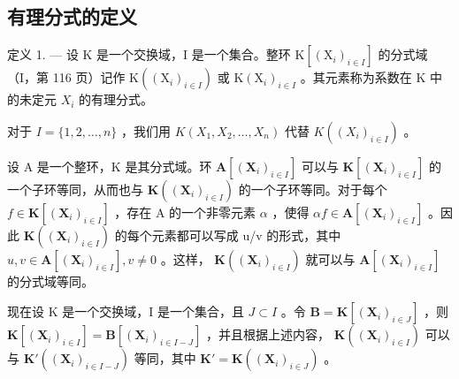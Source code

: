 \subsection{有理分式的定义}

定义 1. --- 设 K 是一个交换域，I 是一个集合。整环 \(\mathrm{K}[(\mathrm{X}_{i})_{i\in I}]\) 的分式域（I，第 116 页）记作 \(\mathrm{K}((\mathrm{X}_{i})_{i\in I})\) 或 \(\mathrm{K}(\mathrm{X}_{i})_{i\in I}\) 。其元素称为系数在 K 中的未定元 \(X_{i}\) 的有理分式。

对于 \(I = \{1, 2, \dots, n\}\) ，我们用 \(K(X_1, X_2, \dots, X_n)\) 代替 \(K((X_i)_{i \in I})\) 。

设 A 是一个整环，K 是其分式域。环 \(\mathbf{A}[(\mathbf{X}_{i})_{i\in I}]\) 可以与 \(\mathbf{K}[(\mathbf{X}_{i})_{i\in I}]\) 的一个子环等同，从而也与 \(\mathbf{K}((\mathbf{X}_{i})_{i\in I})\) 的一个子环等同。对于每个 \(f\in\mathbf{K}[(\mathbf{X}_{i})_{i\in I}]\) ，存在 A 的一个非零元素 \(\alpha\) ，使得 \(\alpha f\in\mathbf{A}[(\mathbf{X}_{i})_{i\in I}]\) 。因此 \(\mathbf{K}((\mathbf{X}_{i})_{i\in I})\) 的每个元素都可以写成 u/v 的形式，其中 \(u,v\in\mathbf{A}[(\mathbf{X}_{i})_{i\in I}],v\neq0\) 。这样， \(\mathbf{K}((\mathbf{X}_{i})_{i\in I})\) 就可以与 \(\mathbf{A}[(\mathbf{X}_{i})_{i\in I}]\) 的分式域等同。

现在设 K 是一个交换域，I 是一个集合，且 \(J \subset I\) 。令 \(\mathbf{B} = \mathbf{K}[(\mathbf{X}_i)_{i \in J}]\) ，则 \(\mathbf{K}[(\mathbf{X}_i)_{i \in I}] = \mathbf{B}[(\mathbf{X}_i)_{i \in I-J}]\) ，并且根据上述内容， \(\mathbf{K}((\mathbf{X}_i)_{i \in I})\) 可以与 \(\mathbf{K}'((\mathbf{X}_i)_{i \in I-J})\) 等同，其中 \(\mathbf{K}' = \mathbf{K}((\mathbf{X}_i)_{i \in J})\) 。

